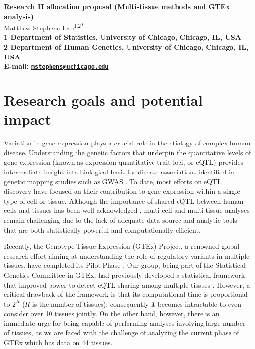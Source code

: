\documentclass[10pt]{article}
\date{}
\begin{document}
\begin{flushleft}
{\Large
\textbf{Research II allocation proposal (Multi-tissue methods and GTEx analysis)}
}
\\
  Matthew Stephens Lab\textsuperscript{1,2*}\\
\bf{1} Department of Statistics, University of Chicago,  Chicago,  IL,  USA
\\
\bf{2} Department of Human Genetics, University of Chicago,  Chicago,  IL,  USA
\\

\textasteriskcentered{} E-mail:   \href{mailto:mstephens@uchicago.edu}{\nolinkurl{mstephens@uchicago.edu}}

\end{flushleft}

\section*{Research goals and potential
impact}\label{research-goals-and-the-potential-impact}
Variation in gene expression plays a crucial role in the etiology of complex human disease.
Understanding the genetic factors that underpin the quantitative levels of gene expression (known as expression quantitative trait loci, or eQTL) provides intermediate insight into biological basis for disease associations identified in genetic mapping studies such as GWAS \cite{Albert2015}. 
To date, most efforts on eQTL discovery have focused on their contribution to gene expression within a single type of cell or tissue. 
Although the importance of shared eQTL between human cells and tissues has been well acknowledged \cite{Dimas2009}, multi-cell and multi-tissue analyses remain challenging due to the lack of adequate data source and analytic tools that are both statistically powerful and computationally efficient.

Recently, the Genotype Tissue Expression (GTEx) Project, a renowned global research effort aiming at understanding the role of regulatory variants in multiple tissues, have completed its Pilot Phase \cite{Ardlie2015}.
Our group, being part of the Statistical Genetics Committee in GTEx, had previously developed a statistical framework that improved power to detect eQTL sharing among multiple tissues \cite{Flutre2013}. 
However, a critical drawback of the framework is that its computational time is proportional to $2^R$ ($R$ is the number of tissues); consequently it becomes intractable to even consider over 10 tissues jointly. 
On the other hand, however, there is an immediate urge for being capable of performing analyses involving large number of tissues, as we are faced with the challenge of analyzing the current phase of GTEx which has data on 44 tissues.
\end{document}
